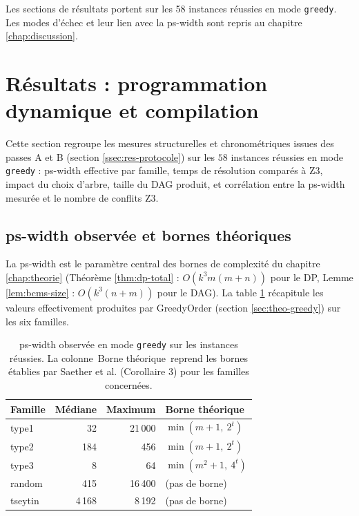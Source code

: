 \documentclass[11pt,a4paper]{report}
\theoremstyle{plain}
\theoremstyle{definition}
\begin{document}
Les sections de résultats portent sur les 58 instances réussies en
mode \texttt{greedy}. Les modes d'échec et leur lien avec la
ps-width sont repris au chapitre \ref{chap:discussion}.
\newpage
\section{Résultats : programmation dynamique et compilation}
\label{sec:res-dp}

Cette section regroupe les mesures structurelles et chronométriques
issues des passes A et B (section \ref{ssec:res-protocole}) sur les
$58$ instances réussies en mode \texttt{greedy} : ps-width effective
par famille, temps de résolution comparés à Z3, impact du choix
d'arbre, taille du DAG produit, et corrélation entre la ps-width
mesurée et le nombre de conflits Z3.


\subsection{ps-width observée et bornes théoriques}
\label{ssec:res-pswidth}

La ps-width est le paramètre central des bornes de complexité du
chapitre \ref{chap:theorie} (Théorème \ref{thm:dp-total} :
$O(k^3 m (m+n))$ pour le DP, Lemme \ref{lem:bcms-size} :
$O(k^3 (n+m))$ pour le DAG). La table \ref{tab:res-pswidth}
récapitule les valeurs effectivement produites par GreedyOrder
(section \ref{sec:theo-greedy}) sur les six familles.

\begin{table}[htbp]
\centering
\caption{ps-width observée en mode \texttt{greedy} sur les
instances réussies. La colonne \og\,Borne théorique\,\fg{} reprend
les bornes établies par Saether et al. \cite{saether2015}
(Corollaire 3) pour les familles concernées.}
\label{tab:res-pswidth}
\begin{tabular}{lrrl}
\toprule
Famille & Médiane & Maximum & Borne théorique \\
\midrule
type1   & 32     & 21\,000 & $\min(m + 1,\ 2^t)$ \\
type2   & 184    & 456     & $\min(m + 1,\ 2^t)$ \\
type3   & 8      & 64      & $\min(m^2 + 1,\ 4^t)$ \\
random  & 415    & 16\,400 & (pas de borne) \\
tseytin & 4\,168 & 8\,192  & (pas de borne) \\
\bottomrule
\end{tabular}
\end{table}
\end{document}

